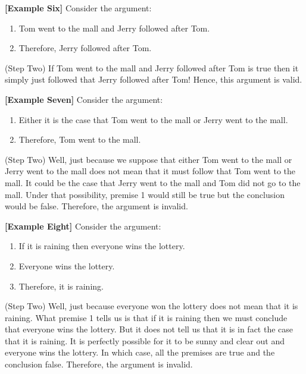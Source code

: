 \documentclass[
]{book}
\providecommand{\tightlist}{%
  \setlength{\itemsep}{0pt}\setlength{\parskip}{0pt}}
\begin{document}
\textbf{{[}Example Six{]}} Consider the argument:

\begin{enumerate}
\def\labelenumi{\arabic{enumi}.}
\tightlist
\item
  Tom went to the mall and Jerry followed after Tom.
\item
  Therefore, Jerry followed after Tom.
\end{enumerate}

(Step Two) If Tom went to the mall and Jerry followed after Tom is true then it simply just followed that Jerry followed after Tom! Hence, this argument is valid.

\textbf{{[}Example Seven{]}} Consider the argument:

\begin{enumerate}
\def\labelenumi{\arabic{enumi}.}
\tightlist
\item
  Either it is the case that Tom went to the mall or Jerry went to the mall.
\item
  Therefore, Tom went to the mall.
\end{enumerate}

(Step Two) Well, just because we suppose that either Tom went to the mall or Jerry went to the mall does not mean that it must follow that Tom went to the mall. It could be the case that Jerry went to the mall and Tom did not go to the mall. Under that possibility, premise 1 would still be true but the conclusion would be false. Therefore, the argument is invalid.

\textbf{{[}Example Eight{]}} Consider the argument:

\begin{enumerate}
\def\labelenumi{\arabic{enumi}.}
\tightlist
\item
  If it is raining then everyone wins the lottery.
\item
  Everyone wins the lottery.
\item
  Therefore, it is raining.
\end{enumerate}

(Step Two) Well, just because everyone won the lottery does not mean that it is raining. What premise 1 tells us is that if it is raining then we must conclude that everyone wins the lottery. But it does not tell us that it is in fact the case that it is raining. It is perfectly possible for it to be sunny and clear out and everyone wins the lottery. In which case, all the premises are true and the conclusion false. Therefore, the argument is invalid.
\end{document}
